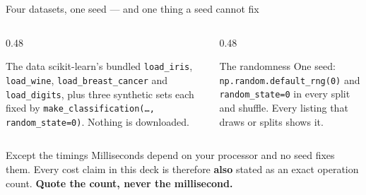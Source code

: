 \documentclass[aspectratio=169]{beamer}
\begin{document}
\begin{frame}{Four datasets, one seed --- and one thing a seed cannot fix}
  \begin{columns}[T]
    \begin{column}{0.48\textwidth}
      \begin{block}{The data}
        \small scikit-learn's bundled \texttt{load\_iris},
        \texttt{load\_wine}, \texttt{load\_breast\_cancer} and
        \texttt{load\_digits}, plus three synthetic sets each fixed by
        \texttt{make\_classification(\dots, random\_state=0)}. Nothing is
        downloaded.
      \end{block}
    \end{column}
    \begin{column}{0.48\textwidth}
      \begin{block}{The randomness}
        \small One seed: \texttt{np.random.default\_rng(0)} and
        \texttt{random\_state=0} in every split and shuffle. Every listing
        that draws or splits shows it.
      \end{block}
    \end{column}
  \end{columns}
  \vspace{0.4em}
  \begin{alertblock}{Except the timings}
    \centering\footnotesize
    Milliseconds depend on your processor and no seed fixes them. Every cost
    claim in this deck is therefore \textbf{also} stated as an exact
    operation count. \textbf{Quote the count, never the millisecond.}
  \end{alertblock}
\end{frame}
\end{document}
